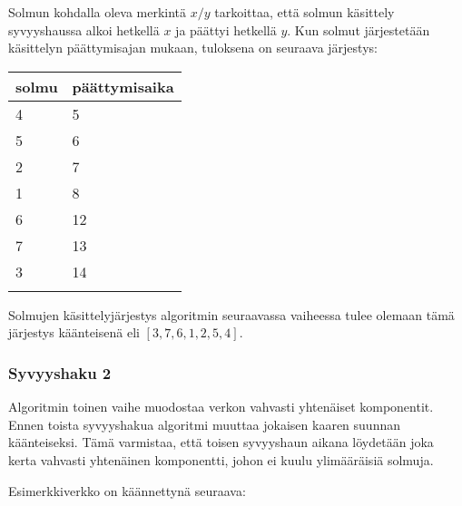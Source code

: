 Solmun kohdalla oleva merkintä $x/y$ tarkoittaa, että solmun
käsittely syvyyshaussa alkoi hetkellä $x$ ja päättyi hetkellä $y$.
Kun solmut järjestetään käsittelyn päättymisajan
mukaan, tuloksena on seuraava järjestys:

\begin{tabular}{ll}
\\
solmu & päättymisaika \\
\hline
4 & 5 \\
5 & 6 \\
2 & 7 \\
1 & 8 \\
6 & 12 \\
7 & 13 \\
3 & 14 \\
\\
\end{tabular}

Solmujen käsittelyjärjestys algoritmin seuraavassa vaiheessa
tulee olemaan tämä järjestys käänteisenä eli $[3,7,6,1,2,5,4]$.

\subsubsection{Syvyyshaku 2}

Algoritmin toinen vaihe muodostaa verkon vahvasti
yhtenäiset komponentit.
Ennen toista syvyyshakua algoritmi muuttaa
jokaisen kaaren suunnan käänteiseksi.
Tämä varmistaa,
että toisen syvyyshaun aikana löydetään
joka kerta vahvasti yhtenäinen komponentti,
johon ei kuulu ylimääräisiä solmuja.

Esimerkkiverkko on käännettynä seuraava:

\begin{center}
\end{center}

